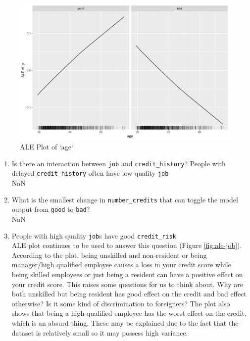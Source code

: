 \documentclass[
]{article}
\begin{document}
\begin{figure}

{\centering \includegraphics[width=0.8\linewidth]{plots/ale_age} 

}

\caption{ALE Plot of `age`}\label{fig:ale-age}
\end{figure}

\begin{enumerate}
\def\labelenumi{\arabic{enumi}.}
\setcounter{enumi}{3}
\item
  Is there an interaction between \texttt{job} and \texttt{credit\_history}? People with delayed \texttt{credit\_history} often have low quality \texttt{job}\\
  NaN
\item
  What is the smallest change in \texttt{number\_credits} that can toggle the model output from \texttt{good} to \texttt{bad}?\\
  NaN
\item
  People with high quality \texttt{job}s have good \texttt{credit\_risk}\\
  ALE plot continues to be used to answer this question (Figure \ref{fig:ale-job}). According to the plot, being unskilled and non-resident or being manager/high qualified employee causes a loss in your credit score while being skilled employees or just being a resident can have a positive effect on your credit score. This raises some questions for us to think about. Why are both unskilled but
  being resident has good effect on the credit and bad effect otherwise? Is it some kind of discrimination to foreigners? The plot also shows that being a high-qualified employee has the worst effect on the credit, which is an absurd thing. These may be explained due to the fact that the dataset is relatively small so it may possess high variance.
\end{enumerate}
\end{document}
